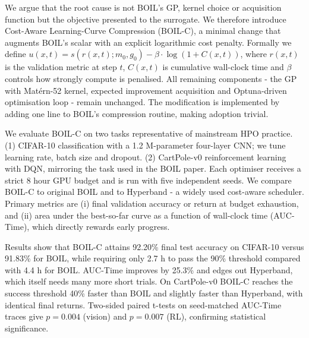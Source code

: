 \documentclass{article} %
\begin{document}
We argue that the root cause is not BOIL’s GP, kernel choice or acquisition function but the objective presented to the surrogate. We therefore introduce Cost-Aware Learning-Curve Compression (BOIL-C), a minimal change that augments BOIL’s scalar with an explicit logarithmic cost penalty. Formally we define \(u(x,t)=s(r(x,t);m_0,g_0)-\beta\cdot\log(1+C(x,t))\), where \(r(x,t)\) is the validation metric at step \(t\), \(C(x,t)\) is cumulative wall-clock time and \(\beta\) controls how strongly compute is penalised. All remaining components - the GP with Mat\'ern-52 kernel, expected improvement acquisition and Optuna-driven optimisation loop - remain unchanged. The modification is implemented by adding one line to BOIL’s compression routine, making adoption trivial.

We evaluate BOIL-C on two tasks representative of mainstream HPO practice. (1) CIFAR-10 classification with a 1.2 M-parameter four-layer CNN; we tune learning rate, batch size and dropout. (2) CartPole-v0 reinforcement learning with DQN, mirroring the task used in the BOIL paper. Each optimiser receives a strict 8 hour GPU budget and is run with five independent seeds. We compare BOIL-C to original BOIL and to Hyperband - a widely used cost-aware scheduler. Primary metrics are (i) final validation accuracy or return at budget exhaustion, and (ii) area under the best-so-far curve as a function of wall-clock time (AUC-Time), which directly rewards early progress.

Results show that BOIL-C attains 92.20\% final test accuracy on CIFAR-10 versus 91.83\% for BOIL, while requiring only 2.7 h to pass the 90\% threshold compared with 4.4 h for BOIL. AUC-Time improves by 25.3\% and edges out Hyperband, which itself needs many more short trials. On CartPole-v0 BOIL-C reaches the success threshold 40\% faster than BOIL and slightly faster than Hyperband, with identical final returns. Two-sided paired t-tests on seed-matched AUC-Time traces give \(p=0.004\) (vision) and \(p=0.007\) (RL), confirming statistical significance.
\end{document}

